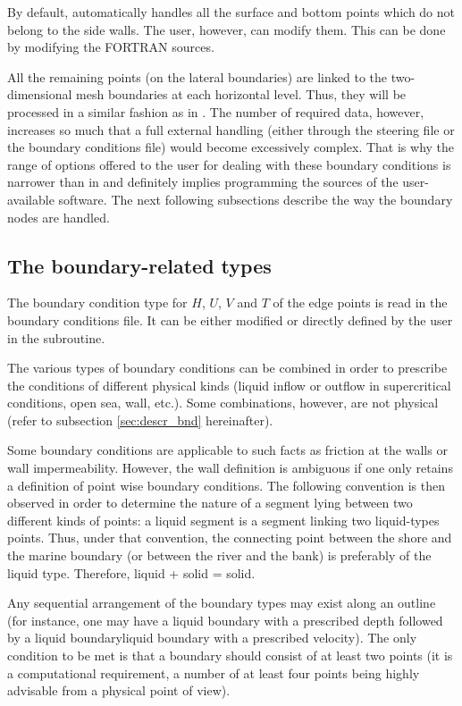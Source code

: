 By default,  automatically handles all the surface and bottom points
which do not belong to the side walls. The user, however, can modify them. This
can be done by modifying the FORTRAN sources.

All the remaining points (on the lateral boundaries) are linked to the
two-dimensional mesh boundaries at each horizontal level. Thus, they will be
processed in a similar fashion as in . The number of required data,
however, increases so much that a full external handling (either through the
steering file or the boundary conditions file) would become excessively
complex. That is why the range of options offered to the user for dealing with
these boundary conditions is narrower than in  and definitely implies
programming the sources of the user-available software. The next following
subsections describe the way the boundary nodes are handled.


\subsection{The boundary-related types}

The boundary condition type for $H$, $U$, $V$ and $T$ of the edge points is
read in the boundary conditions file. It can be either modified or directly
defined by the user in the  subroutine.

The various types of boundary conditions can be combined in order to prescribe
the conditions of different physical kinds (liquid inflow or outflow in
supercritical conditions, open sea, wall, etc.). Some combinations, however,
are not physical (refer to subsection \ref{sec:descr_bnd} hereinafter).

Some boundary conditions are applicable to such facts as friction at the walls
or wall impermeability. However, the wall definition is ambiguous if one only
retains a definition of point wise boundary conditions. The following
convention is then observed in order to determine the nature of a segment lying
between two different kinds of points: a liquid segment is a segment linking
two liquid-types points. Thus, under that convention, the connecting point
between the shore and the marine boundary (or between the river and the bank)
is preferably of the liquid type. Therefore, liquid + solid = solid.

Any sequential arrangement of the boundary types may exist along an outline
(for instance, one may have a liquid boundary with a prescribed depth followed
by a liquid boundaryliquid boundary with a prescribed velocity). The only
condition to be met is that a boundary should consist of at least two points
(it is a computational requirement, a number of at least four points being
highly advisable from a physical point of view).


